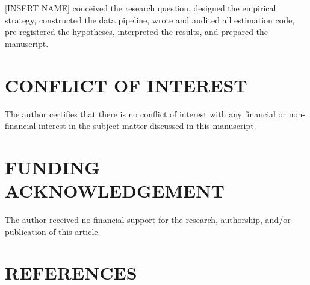 \documentclass[12pt]{article}
\begin{document}
[INSERT NAME] conceived the research question, designed the empirical
strategy, constructed the data pipeline, wrote and audited all estimation
code, pre-registered the hypotheses, interpreted the results, and prepared the
manuscript.

\section*{CONFLICT OF INTEREST}

The author certifies that there is no conflict of interest with any financial
or non-financial interest in the subject matter discussed in this manuscript.

\section*{FUNDING ACKNOWLEDGEMENT}

The author received no financial support for the research, authorship, and/or
publication of this article.

\section*{REFERENCES}
\end{document}
